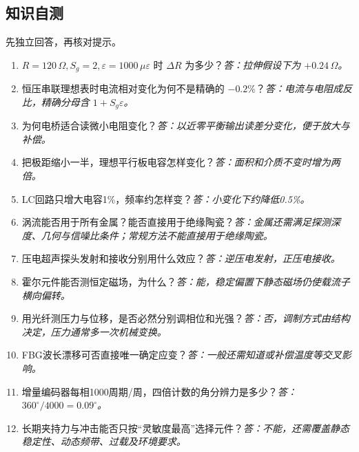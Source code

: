 \subsection*{知识自测}
先独立回答，再核对提示。
\begin{enumerate}
\item $R=120\,\Omega,S_g=2,\varepsilon=1000\,\mu\varepsilon$ 时 $\Delta R$ 为多少？\textit{答：拉伸假设下为 $+0.24\,\Omega$。}
\item 恒压串联理想表时电流相对变化为何不是精确的 $-0.2\%$？\textit{答：电流与电阻成反比，精确分母含 $1+S_g\varepsilon$。}
\item 为何电桥适合读微小电阻变化？\textit{答：以近零平衡输出读差分变化，便于放大与补偿。}
\item 把极距缩小一半，理想平行板电容怎样变化？\textit{答：面积和介质不变时增为两倍。}
\item LC回路只增大电容1\%，频率约怎样变？\textit{答：小变化下约降低0.5\%。}
\item 涡流能否用于所有金属？能否直接用于绝缘陶瓷？\textit{答：金属还需满足探测深度、几何与信噪比条件；常规方法不能直接用于绝缘陶瓷。}
\item 压电超声探头发射和接收分别用什么效应？\textit{答：逆压电发射，正压电接收。}
\item 霍尔元件能否测恒定磁场，为什么？\textit{答：能，稳定偏置下静态磁场仍使载流子横向偏转。}
\item 用光纤测压力与位移，是否必然分别调相位和光强？\textit{答：否，调制方式由结构决定，压力通常多一次机械变换。}
\item FBG波长漂移可否直接唯一确定应变？\textit{答：一般还需知道或补偿温度等交叉影响。}
\item 增量编码器每相1000周期/周，四倍计数的角分辨力是多少？\textit{答：$360^\circ/4000=0.09^\circ$。}
\item 长期夹持力与冲击能否只按“灵敏度最高”选择元件？\textit{答：不能，还需覆盖静态稳定性、动态频带、过载及环境要求。}
\end{enumerate}
